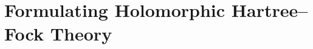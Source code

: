 \documentclass[a4paper,12pt,openright,oneside]{article}
\begin{document}
\newpage

\thispagestyle{plain}
\section{Formulating Holomorphic Hartree--Fock Theory}


\newpage

\newpage





\newpage
\thispagestyle{plain}

\newpage
\cleardoublepage
\end{document}
